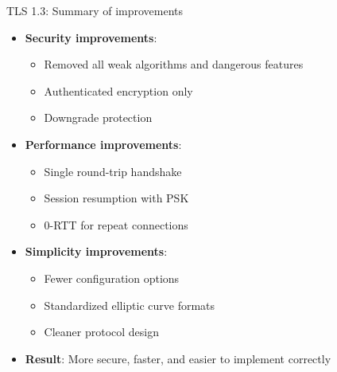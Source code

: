 \documentclass[aspectratio=169, lualatex, handout]{beamer}
\begin{document}
\begin{frame}{TLS 1.3: Summary of improvements}
	\begin{itemize}
		\item \textbf{Security improvements}:
		      \begin{itemize}
			      \item Removed all weak algorithms and dangerous features
			      \item Authenticated encryption only
			      \item Downgrade protection
		      \end{itemize}
		\item \textbf{Performance improvements}:
		      \begin{itemize}
			      \item Single round-trip handshake
			      \item Session resumption with PSK
			      \item 0-RTT for repeat connections
		      \end{itemize}
		\item \textbf{Simplicity improvements}:
		      \begin{itemize}
			      \item Fewer configuration options
			      \item Standardized elliptic curve formats
			      \item Cleaner protocol design
		      \end{itemize}
		\item \textbf{Result}: More secure, faster, and easier to implement correctly
	\end{itemize}
\end{frame}
\end{document}
